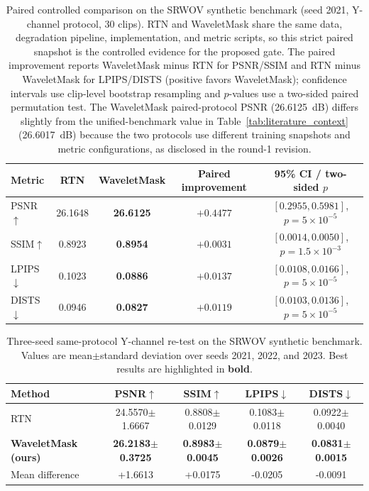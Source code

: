 {\begin{table}[H]
\caption{Paired controlled comparison on the SRWOV synthetic benchmark (seed 2021, Y-channel protocol, 30 clips). RTN and WaveletMask share the same data, degradation pipeline, implementation, and metric scripts, so this strict paired snapshot is the controlled evidence for the proposed gate. The paired improvement reports WaveletMask minus RTN for PSNR/SSIM and RTN minus WaveletMask for LPIPS/DISTS (positive favors WaveletMask); confidence intervals use clip-level bootstrap resampling and $p$-values use a two-sided paired permutation test. The WaveletMask paired-protocol PSNR (26.6125~dB) differs slightly from the unified-benchmark value in Table~\ref{tab:literature_context} (26.6017~dB) because the two protocols use different training snapshots and metric configurations, as disclosed in the round-1 revision.\label{tab:same_protocol_main}\label{tab:paired_seed2021_stats}}
\footnotesize
\begin{tabularx}{\textwidth}{lCCCC}
\toprule
\textbf{Metric} & \textbf{RTN} & \textbf{WaveletMask} & \textbf{Paired improvement} & \textbf{95\% CI / two-sided $p$} \\
\midrule
PSNR$\uparrow$  & 26.1648 & \textbf{26.6125} & $+0.4477$ & $[0.2955, 0.5981]$, $p=5\times10^{-5}$ \\
SSIM$\uparrow$  & 0.8923  & \textbf{0.8954}  & $+0.0031$ & $[0.0014, 0.0050]$, $p=1.5\times10^{-3}$ \\
LPIPS$\downarrow$ & 0.1023 & \textbf{0.0886} & $+0.0137$ & $[0.0108, 0.0166]$, $p=5\times10^{-5}$ \\
DISTS$\downarrow$ & 0.0946 & \textbf{0.0827} & $+0.0119$ & $[0.0103, 0.0136]$, $p=5\times10^{-5}$ \\
\bottomrule
\end{tabularx}
\normalsize
\end{table}

\begin{table}[H]
\caption{Three-seed same-protocol Y-channel re-test on the SRWOV synthetic benchmark. Values are mean$\pm$standard deviation over seeds 2021, 2022, and 2023. Best results are highlighted in \textbf{bold}.\label{tab:three_seed_summary}}
\begin{tabularx}{\textwidth}{lCCCC}
\toprule
\textbf{Method} & \textbf{PSNR$\uparrow$} & \textbf{SSIM$\uparrow$} & \textbf{LPIPS$\downarrow$} & \textbf{DISTS$\downarrow$} \\
\midrule
RTN~\cite{rtn2022} & 24.5570$\pm$1.6667 & 0.8808$\pm$0.0129 & 0.1083$\pm$0.0118 & 0.0922$\pm$0.0040 \\
\textbf{WaveletMask (ours)} & \textbf{26.2183$\pm$0.3725} & \textbf{0.8983$\pm$0.0045} & \textbf{0.0879$\pm$0.0026} & \textbf{0.0831$\pm$0.0015} \\
\midrule
Mean difference & +1.6613 & +0.0175 & -0.0205 & -0.0091 \\
\bottomrule
\end{tabularx}
\end{table}

}
